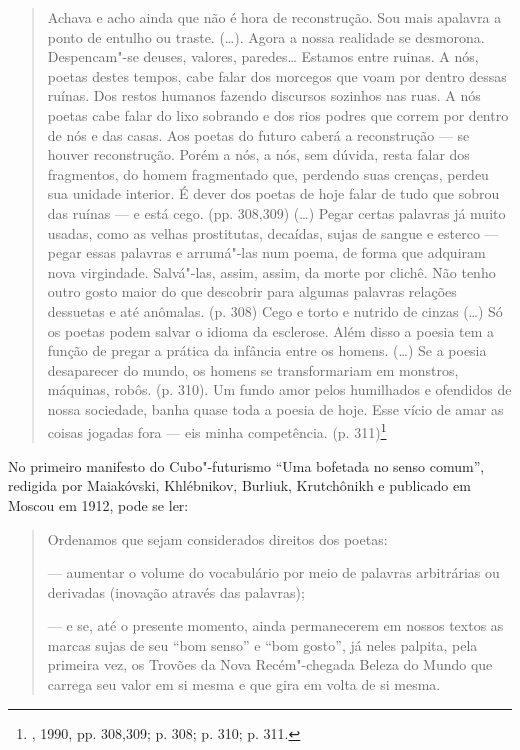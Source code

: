 \begin{quote}
Achava e acho ainda que não é hora de reconstrução. Sou mais apalavra a
ponto de entulho ou traste. (\ldots{}). Agora a nossa realidade se desmorona.
Despencam"-se deuses, valores, paredes\ldots{} Estamos entre ruinas. A nós,
poetas destes tempos, cabe falar dos morcegos que voam por dentro dessas
ruínas. Dos restos humanos fazendo discursos sozinhos nas ruas. A nós
poetas cabe falar do lixo sobrando e dos rios podres que correm por
dentro de nós e das casas. Aos poetas do futuro caberá a reconstrução ---
se houver reconstrução. Porém a nós, a nós, sem dúvida, resta falar
dos fragmentos, do homem fragmentado que, perdendo suas crenças, perdeu
sua unidade interior. É dever dos poetas de hoje falar de tudo que
sobrou das ruínas --- e está cego. (pp. 308,309) (\ldots{}) Pegar certas
palavras já muito usadas, como as velhas prostitutas, decaídas, sujas de
sangue e esterco --- pegar essas palavras e arrumá"-las num poema, de
forma que adquiram nova virgindade. Salvá"-las, assim, assim, da morte
por clichê. Não tenho outro gosto maior do que descobrir para algumas
palavras relações dessuetas e até anômalas. (p. 308) Cego e torto e
nutrido de cinzas (\ldots{}) Só os poetas podem salvar o idioma da esclerose.
Além disso a poesia tem a função de pregar a prática da infância entre
os homens. (\ldots{}) Se a poesia desaparecer do mundo, os homens se
transformariam em monstros, máquinas, robôs. (p. 310). Um fundo amor
pelos humilhados e ofendidos de nossa sociedade, banha quase toda a
poesia de hoje. Esse vício de amar as coisas jogadas fora --- eis minha
competência. (p. 311)\footnote{, 1990, pp. 308,309; p. 308; p.
  310; p. 311.}
\end{quote}

No primeiro manifesto do Cubo"-futurismo ``Uma bofetada no senso comum'',
redigida por  Maiakóvski,  Khlébnikov,  Burliuk,  Krutchônikh e
publicado em Moscou em 1912, pode se ler:

\begin{quote}
Ordenamos que sejam considerados direitos dos poetas:

 --- aumentar o volume do vocabulário por meio de palavras arbitrárias
ou derivadas (inovação através das palavras);

 --- e se, até o presente momento, ainda permanecerem em nossos textos
as marcas sujas de seu ``bom senso'' e ``bom gosto'', já neles palpita,
pela primeira vez, os Trovões da Nova Recém"-chegada Beleza do Mundo que
carrega seu valor em si mesma e que gira em volta de si mesma.
\end{quote}

